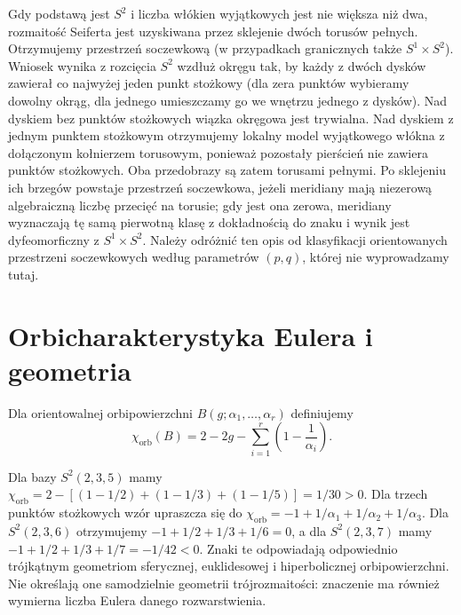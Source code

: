 \begin{uwaga}
Gdy podstawą jest $S^2$ i liczba włókien wyjątkowych
jest nie większa niż dwa, rozmaitość Seiferta jest
uzyskiwana przez sklejenie dwóch torusów pełnych.
Otrzymujemy przestrzeń soczewkową (w przypadkach
granicznych także $S^1\times S^2$). Wniosek wynika
z rozcięcia $S^2$ wzdłuż okręgu tak, by każdy
z dwóch dysków zawierał co najwyżej jeden punkt
stożkowy (dla zera punktów wybieramy dowolny
okrąg, dla jednego umieszczamy go we wnętrzu
jednego z dysków). Nad dyskiem bez punktów
stożkowych wiązka okręgowa jest trywialna.
Nad dyskiem z jednym punktem stożkowym
otrzymujemy lokalny model wyjątkowego włókna
z dołączonym kołnierzem torusowym, ponieważ
pozostały pierścień nie zawiera punktów
stożkowych. Oba przedobrazy są zatem torusami
pełnymi. Po sklejeniu ich brzegów powstaje
przestrzeń soczewkowa, jeżeli meridiany mają
niezerową algebraiczną liczbę przecięć na torusie;
gdy jest ona zerowa, meridiany wyznaczają tę samą
pierwotną klasę z dokładnością do znaku i wynik
jest dyfeomorficzny z $S^1\times S^2$. Należy odróżnić ten opis od klasyfikacji
orientowanych przestrzeni soczewkowych według
parametrów $(p,q)$, której nie wyprowadzamy tutaj.
\end{uwaga}

\section{Orbicharakterystyka Eulera i geometria}
\label{sec:tg-seifert-orbifold}

\begin{definicja}[Orbicharakterystyka]
Dla orientowalnej orbipowierzchni
$B(g;\alpha_1,\ldots,\alpha_r)$ definiujemy
\[
\chi_{\mathrm{orb}}(B)=2-2g-
\sum_{i=1}^r\left(1-\frac1{\alpha_i}\right).
\]
\end{definicja}

\begin{przyklad}
Dla bazy $S^2(2,3,5)$ mamy
$\chi_{\mathrm{orb}}=2-[(1-1/2)+(1-1/3)+(1-1/5)]
=1/30>0$. Dla trzech punktów stożkowych
wzór upraszcza się do
$\chi_{\mathrm{orb}}=-1+1/\alpha_1+1/\alpha_2+1/\alpha_3$.
Dla $S^2(2,3,6)$ otrzymujemy
$-1+1/2+1/3+1/6=0$, a dla $S^2(2,3,7)$ mamy
$-1+1/2+1/3+1/7=-1/42<0$.
Znaki te odpowiadają odpowiednio trójkątnym
geometriom sferycznej, euklidesowej i hiperbolicznej
orbipowierzchni. Nie określają one samodzielnie geometrii
trójrozmaitości: znaczenie ma również wymierna
liczba Eulera danego rozwarstwienia.
\end{przyklad}

